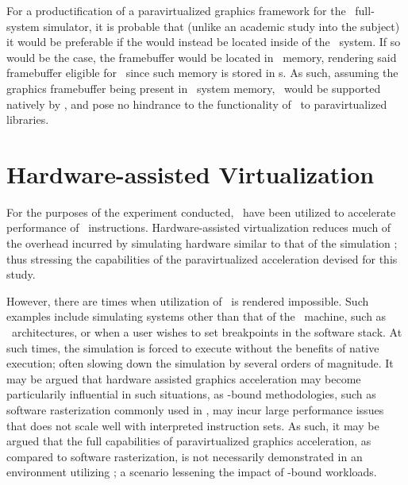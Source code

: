 For a productification of a paravirtualized graphics framework for the \dvttermsimics\ full-system simulator, it is probable that (unlike an academic study into the subject) it would be preferable if the would instead be located inside of the \dvttermtarget\ system.
If so would be the case, the framebuffer would be located in \dvttermtarget\ memory, rendering said framebuffer eligible for \dvttermreverseexecution\ since such memory is stored in \dvttermcheckpoint s.
As such, assuming the graphics framebuffer being present in \dvttermtarget\ system memory, \dvttermreverseexecution\ would be supported natively by \dvttermsimics , and pose no hindrance to the functionality of \dvttermreverseexecution\ to paravirtualized libraries.

\section{Hardware-assisted Virtualization}
\label{sec:discussion_hostvirtualizationextensions}
For the purposes of the experiment conducted, \dvttermdirectvirtualization\ have been utilized to accelerate performance of \dvttermxeightysix\ instructions.
Hardware-assisted virtualization reduces much of the overhead incurred by simulating hardware similar to that of the simulation \dvttermhost ; thus stressing the capabilities of the paravirtualized acceleration devised for this study.

However, there are times when utilization of \dvttermdirectvirtualization\ is rendered impossible.
Such examples include simulating systems other than that of the \dvttermhost\ machine, such as \dvttermarm\ architectures, or when a user wishes to set breakpoints in the software stack.
At such times, the simulation is forced to execute without the benefits of native execution; often slowing down the simulation by several orders of magnitude.
It may be argued that hardware assisted graphics acceleration may become particularily influential in such situations, as \dvttermcpu -bound methodologies, such as software rasterization commonly used in \dvttermsimics , may incur large performance issues that does not scale well with interpreted instruction sets.
As such, it may be argued that the full capabilities of paravirtualized graphics acceleration, as compared to software rasterization, is not necessarily demonstrated in an environment utilizing \dvttermdirectvirtualization ; a scenario lessening the impact of \dvttermcpu -bound workloads.
